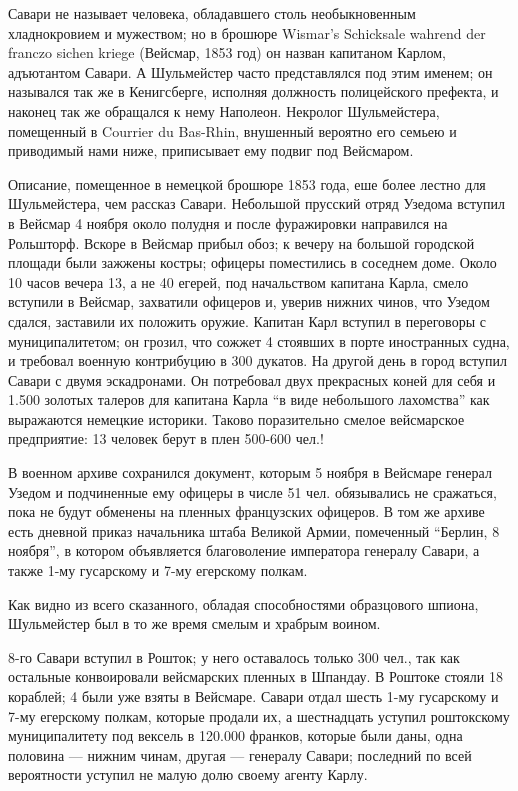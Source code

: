 \documentclass[
  oneside,
  12pt,
  titlepage]{book}
\begin{document}
Савари не называет человека, обладавшего столь необыкновенным хладнокровием и мужеством; но в брошюре Wismar's Schicksale wahrend der franczo sichen kriege (Вейсмар, 1853 год) он назван капитаном Карлом, адъютантом Савари. А Шульмейстер часто представлялся под этим именем; он назывался так же в Кенигсберге, исполняя должность полицейского префекта, и наконец так же обращался к нему Наполеон. Некролог Шульмейстера, помещенный в Courrier du Bas-Rhin, внушенный вероятно его семьею и приводимый нами ниже, приписывает ему подвиг под Вейсмаром.

Описание, помещенное в немецкой брошюре 1853 года, еше более лестно для Шульмейстера, чем рассказ Савари. Небольшой прусский отряд Узедома вступил в Вейсмар 4 ноября около полудня и после фуражировки направился на Рольшторф. Вскоре в Вейсмар прибыл обоз; к вечеру на большой городской площади были зажжены костры; офицеры поместились в соседнем доме. Около 10 часов вечера 13, а не 40 егерей, под начальством капитана Карла, смело вступили в Вейсмар, захватили офицеров и, уверив нижних чинов, что Узедом сдался, заставили их положить оружие. Капитан Карл вступил в переговоры с муниципалитетом; он грозил, что сожжет 4 стоявших в порте иностранных судна, и требовал военную контрибуцию в 300 дукатов. На другой день в город вступил Савари с двумя эскадронами. Он потребовал двух прекрасных коней для себя и 1.500 золотых талеров для капитана Карла ``в виде небольшого лахомства'' как выражаются немецкие историки. Таково поразительно смелое вейсмарское предприятие: 13 человек берут в плен 500-600 чел.!

В военном архиве сохранился документ, которым 5 ноября в Вейсмаре генерал Узедом и подчиненные ему офицеры в числе 51 чел. обязывались не сражаться, пока не будут обменены на пленных французских офицеров. В том же архиве есть дневной приказ начальника штаба Великой Армии, помеченный ``Берлин, 8 ноября'', в котором объявляется благоволение императора генералу Савари, а также 1-му гусарскому и 7-му егерскому полкам.

Как видно из всего сказанного, обладая способностями образцового шпиона, Шульмейстер был в то же время смелым и храбрым воином.

8-го Савари вступил в Рошток; у него оставалось только 300 чел., так как остальные конвоировали вейсмарских пленных в Шпандау. В Роштоке стояли 18 кораблей; 4 были уже взяты в Вейсмаре. Савари отдал шесть 1-му гусарскому и 7-му егерскому полкам, которые продали их, а шестнадцать уступил роштокскому муниципалитету под вексель в 120.000 франков, которые были даны, одна половина --- нижним чинам, другая --- генералу Савари; последний по всей вероятности уступил не малую долю своему агенту Карлу.
\end{document}

